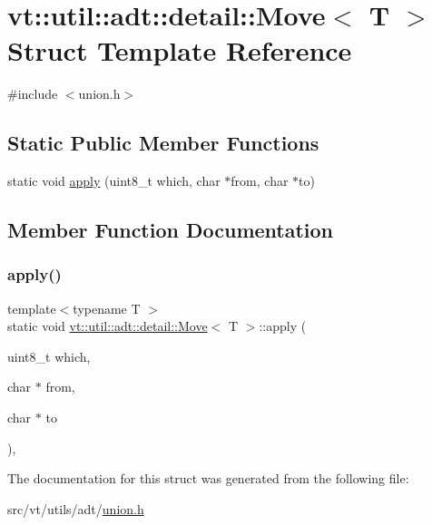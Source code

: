 \hypertarget{structvt_1_1util_1_1adt_1_1detail_1_1_move_3_01_t_01_4}{}\section{vt\+:\+:util\+:\+:adt\+:\+:detail\+:\+:Move$<$ T $>$ Struct Template Reference}
\label{structvt_1_1util_1_1adt_1_1detail_1_1_move_3_01_t_01_4}


{\ttfamily \#include $<$union.\+h$>$}

\subsection*{Static Public Member Functions}
\begin{DoxyCompactItemize}
\item 
static void \hyperlink{structvt_1_1util_1_1adt_1_1detail_1_1_move_3_01_t_01_4_a9b3a7eae0aa568674f94b11719296f16}{apply} (uint8\+\_\+t which, char $\ast$from, char $\ast$to)
\end{DoxyCompactItemize}


\subsection{Member Function Documentation}
\mbox{\label{structvt_1_1util_1_1adt_1_1detail_1_1_move_3_01_t_01_4_a9b3a7eae0aa568674f94b11719296f16}} 
\subsubsection{\texorpdfstring{apply()}{apply()}}
{\footnotesize\ttfamily template$<$typename T $>$ \\
static void \hyperlink{structvt_1_1util_1_1adt_1_1detail_1_1_move}{vt\+::util\+::adt\+::detail\+::\+Move}$<$ T $>$\+::apply (\begin{DoxyParamCaption}\item[{uint8\+\_\+t}]{which,  }\item[{char $\ast$}]{from,  }\item[{char $\ast$}]{to }\end{DoxyParamCaption})\hspace{0.3cm}{\ttfamily [inline]}, {\ttfamily [static]}}



The documentation for this struct was generated from the following file\+:\begin{DoxyCompactItemize}
\item 
src/vt/utils/adt/\hyperlink{union_8h}{union.\+h}\end{DoxyCompactItemize}
